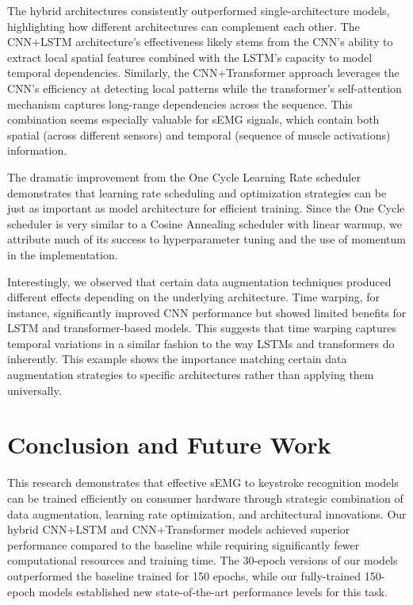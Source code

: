 \documentclass{article}
\begin{document}
The hybrid architectures consistently outperformed single-architecture models, highlighting how different architectures can complement each other. The CNN+LSTM architecture's effectiveness likely stems from the CNN's ability to extract local spatial features combined with the LSTM's capacity to model temporal dependencies. Similarly, the CNN+Transformer approach leverages the CNN's efficiency at detecting local patterns while the transformer's self-attention mechanism captures long-range dependencies across the sequence. This combination seems especially valuable for sEMG signals, which contain both spatial (across different sensors) and temporal (sequence of muscle activations) information.

The dramatic improvement from the One Cycle Learning Rate scheduler demonstrates that learning rate scheduling and optimization strategies can be just as important as model architecture for efficient training. Since the One Cycle scheduler is very similar to a Cosine Annealing scheduler with linear warmup, we attribute much of its success to hyperparameter tuning and the use of momentum in the implementation.

Interestingly, we observed that certain data augmentation techniques produced different effects depending on the underlying architecture. Time warping, for instance, significantly improved CNN performance but showed limited benefits for LSTM and transformer-based models. This suggests that time warping captures temporal variations in a similar fashion to the way LSTMs and transformers do inherently. This example shows the importance matching certain data augmentation strategies to specific architectures rather than applying them universally.

\section{Conclusion and Future Work}

This research demonstrates that effective sEMG to keystroke recognition models can be trained efficiently on consumer hardware through strategic combination of data augmentation, learning rate optimization, and architectural innovations. Our hybrid CNN+LSTM and CNN+Transformer models achieved superior performance compared to the baseline while requiring significantly fewer computational resources and training time. The 30-epoch versions of our models outperformed the baseline trained for 150 epochs, while our fully-trained 150-epoch models established new state-of-the-art performance levels for this task.
\end{document}
